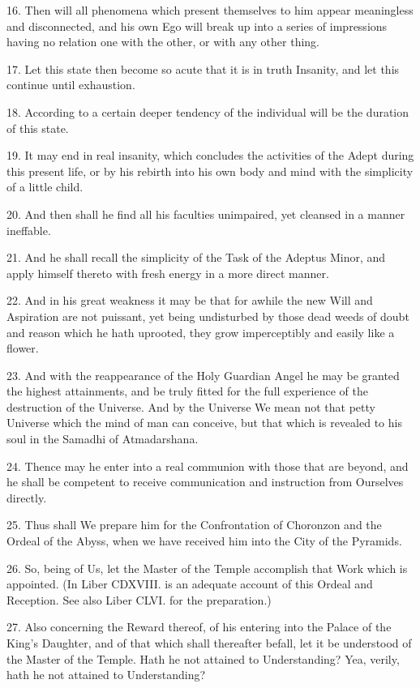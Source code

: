16. Then will all phenomena which present themselves to him appear meaningless and disconnected, and his own Ego will break up into a series of impressions having no relation one with the other, or with any other thing.

17. Let this state then become so acute that it is in truth Insanity, and let this continue until exhaustion.

18. According to a certain deeper tendency of the individual will be the duration of this state.

19. It may end in real insanity, which concludes the activities of the Adept during this present life, or by his rebirth into his own body and mind with the simplicity of a little child.

20. And then shall he find all his faculties unimpaired, yet cleansed in a manner ineffable.

21. And he shall recall the simplicity of the Task of the Adeptus Minor, and apply himself thereto with fresh energy in a more direct manner.

22. And in his great weakness it may be that for awhile the new Will and Aspiration are not puissant, yet being undisturbed by those dead weeds of doubt and reason which he hath uprooted, they grow imperceptibly and easily like a flower.

23. And with the reappearance of the Holy Guardian Angel he may be granted the highest attainments, and be truly fitted for the full experience of the destruction of the Universe. And by the Universe We mean not that petty Universe which the mind of man can conceive, but that which is revealed to his soul in the Samadhi of Atmadarshana.

24. Thence may he enter into a real communion with those that are beyond, and he shall be competent to receive communication and instruction from Ourselves directly.

25. Thus shall We prepare him for the Confrontation of Choronzon and the Ordeal of the Abyss, when we have received him into the City of the Pyramids.

26. So, being of Us, let the Master of the Temple accomplish that Work which is appointed. (In Liber CDXVIII. is an adequate account of this Ordeal and Reception. See also Liber CLVI. for the preparation.)

27. Also concerning the Reward thereof, of his entering into the Palace of the King's Daughter, and of that which shall thereafter befall, let it be understood of the Master of the Temple. Hath he not attained to Understanding? Yea, verily, hath he not attained to Understanding?
